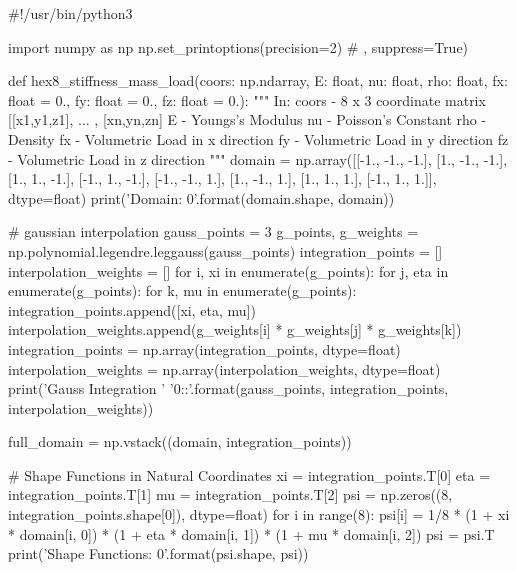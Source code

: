 \documentclass[10pt,b5paper,titlepage]{book}
\begin{document}
\begin{python}
#!/usr/bin/python3

import numpy as np
np.set_printoptions(precision=2) # , suppress=True)

def hex8_stiffness_mass_load(coors: np.ndarray,
                             E: float,
                             nu: float,
                             rho: float,
                             fx: float = 0.,
                             fy: float = 0.,
                             fz: float = 0.):
    """
    In:
        coors - 8 x 3 coordinate matrix
                [[x1,y1,z1], ... , [xn,yn,zn]
        E     - Youngs's Modulus
        nu    - Poisson's Constant
        rho   - Density
        fx    - Volumetric Load in x direction
        fy    - Volumetric Load in y direction
        fz    - Volumetric Load in z direction
    """
    domain = np.array([[-1., -1., -1.],
                       [1., -1., -1.],
                       [1., 1., -1.],
                       [-1., 1., -1.],
                       [-1., -1., 1.],
                       [1., -1., 1.],
                       [1., 1., 1.],
                       [-1., 1., 1.]], dtype=float)
    print('Domain: {0}'.format(domain.shape, domain))

    # gaussian interpolation
    gauss_points = 3
    g_points, g_weights = np.polynomial.legendre.leggauss(gauss_points)
    integration_points = []
    interpolation_weights = []
    for i, xi in enumerate(g_points):
        for j, eta in enumerate(g_points):
            for k, mu in enumerate(g_points):
                integration_points.append([xi, eta, mu])
                interpolation_weights.append(g_weights[i] *
                                             g_weights[j] *
                                             g_weights[k])
    integration_points = np.array(integration_points, dtype=float)
    interpolation_weights = np.array(interpolation_weights, dtype=float)
    print('Gauss Integration '
          '{0}:\nWeights:'.format(gauss_points,
                                            integration_points,
                                            interpolation_weights))

    full_domain = np.vstack((domain, integration_points))

    # Shape Functions in Natural Coordinates
    xi = integration_points.T[0]
    eta = integration_points.T[1]
    mu = integration_points.T[2]
    psi = np.zeros((8, integration_points.shape[0]), dtype=float)
    for i in range(8):
        psi[i] = 1/8 * (1 + xi * domain[i, 0]) *
                       (1 + eta * domain[i, 1]) *
                       (1 + mu * domain[i, 2])
    psi = psi.T
    print('Shape Functions: {0}'.format(psi.shape, psi))


\end{python}
\end{document}
